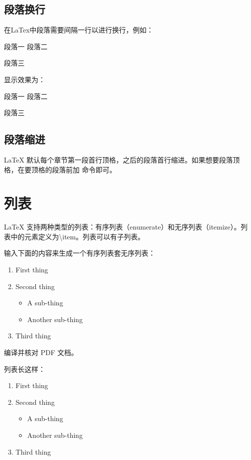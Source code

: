 \subsection{段落换行}
在LaTex中段落需要间隔一行以进行换行，例如：

\begin{python}
段落一
段落二

段落三
\end{python}

显示效果为：

段落一
段落二

段落三

\subsection{段落缩进}

LaTeX 默认每个章节第一段首行顶格，之后的段落首行缩进。如果想要段落顶格，在要顶格的段落前加 \noindent 命令即可。

\section{列表}

LaTeX 支持两种类型的列表：有序列表（enumerate）和无序列表（itemize）。列表中的元素定义为\textbackslash item。列表可以有子列表。

\rightarrow 输入下面的内容来生成一个有序列表套无序列表：

\begin{python}
\begin{enumerate}
	\item First thing
	
	\item Second thing
	\begin{itemize}
		\item A sub-thing
		
		\item Another sub-thing
	\end{itemize}
	
	\item Third thing
\end{enumerate}
\end{python}

\rightarrow 编译并核对 PDF 文档。

列表长这样：

\begin{enumerate}
	\item First thing
	
	\item Second thing
	\begin{itemize}
		\item A sub-thing
		
		\item Another sub-thing
	\end{itemize}
	
	\item Third thing
\end{enumerate}

